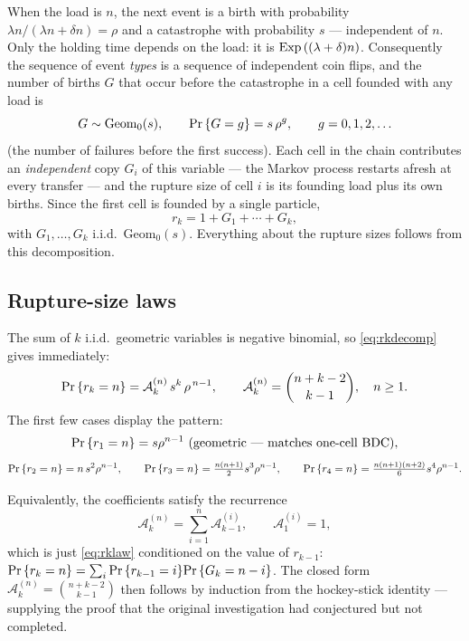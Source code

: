 When the load is $n$, the next event is a birth with probability
$\lambda n/(\lambda n+\delta n)=\rho$ and a catastrophe with probability $s$
--- independent of $n$. Only the holding time depends on the load: it is
$\mathrm{Exp}\left((\lambda+\delta)n\right)$. Consequently the sequence of event
\emph{types} is a sequence of independent coin flips, and the number of
births $G$ that occur before the catastrophe in a cell founded with any load
is
\begin{equation}
G\sim\mathrm{Geom}_0(s),
\qquad
{\text{Pr}\left\{G=g\right\}}=s\,\rho^g,\qquad g=0,1,2,\ldots
\end{equation}
(the number of failures before the first success). Each cell in the chain
contributes an \emph{independent} copy $G_i$ of this variable --- the Markov
process restarts afresh at every transfer --- and the rupture size of cell
$i$ is its founding load plus its own births. Since the first cell is
founded by a single particle,
\begin{equation}
r_k = 1 + G_1 + \cdots + G_k,
\label{eq:rkdecomp}
\end{equation}
with $G_1,\ldots,G_k$ i.i.d.\ $\mathrm{Geom}_0(s)$. Everything about the
rupture sizes follows from this decomposition.

\subsection{Rupture-size laws}

The sum of $k$ i.i.d.\ geometric variables is negative binomial, so
\eqref{eq:rkdecomp} gives immediately:
\begin{equation}
{\text{Pr}\left\{r_k=n\right\}}=\mathcal{A}^{(n)}_{k}\,s^{k}\,\rho^{\,n-1},
\qquad
\mathcal{A}^{(n)}_{k}=\binom{n+k-2}{k-1},
\quad n\ge1.
\label{eq:rklaw}
\end{equation}
The first few cases display the pattern:
\begin{equation}
{\text{Pr}\left\{r_1=n\right\}}=s\rho^{n-1}\ \text{(geometric --- matches one-cell BDC)},
\end{equation}
\begin{equation}
{\text{Pr}\left\{r_2=n\right\}}=n\,s^2\rho^{n-1},
\qquad
{\text{Pr}\left\{r_3=n\right\}}=\tfrac{n(n+1)}{2}s^3\rho^{n-1},
\qquad
{\text{Pr}\left\{r_4=n\right\}}=\tfrac{n(n+1)(n+2)}{6}s^4\rho^{n-1}.
\end{equation}

Equivalently, the coefficients satisfy the recurrence
\begin{equation}
\mathcal{A}^{(n)}_{k}=\sum_{i=1}^{n}\mathcal{A}^{(i)}_{k-1},
\qquad
\mathcal{A}^{(i)}_{1}=1,
\end{equation}
which is just \eqref{eq:rklaw} conditioned on the value of $r_{k-1}$:
${\text{Pr}\left\{r_k=n\right\}}=\sum_i{\text{Pr}\left\{r_{k-1}=i\right\}}{\text{Pr}\left\{G_k=n-i\right\}}$. The closed form
$\mathcal{A}^{(n)}_{k}=\binom{n+k-2}{k-1}$ then follows by induction from
the hockey-stick identity --- supplying the proof that the original
investigation had conjectured but not completed.

